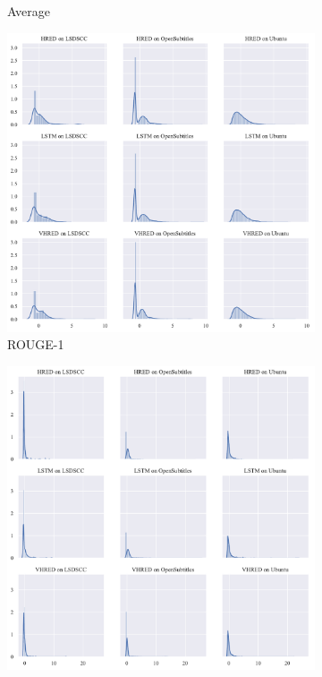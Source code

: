\begin{figure}[H]
\begin{subfigure}{0.33\linewidth}
        \centering
        \caption{Average}
    \end{subfigure}%
    \begin{subfigure}{0.33\linewidth}
        \centering
        \includegraphics[width=\linewidth]{figure/distplot_grid/rouge_1/plot.pdf}
        \caption{ROUGE-1}
    \end{subfigure}
    \begin{subfigure}{0.33\linewidth}
        \centering
        \includegraphics[width=\linewidth]{figure/distplot_grid/bleu_2/plot.pdf}

\end{subfigure}
\end{figure}
